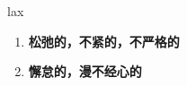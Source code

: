 
\begin{frame}
{\huge lax}
\begin{center}
\begin{enumerate}\Large
  \item \textbf{松弛的，不紧的，不严格的}
  \item \textbf{懈怠的，漫不经心的}
\end{enumerate}
\end{center}
\end{frame}
